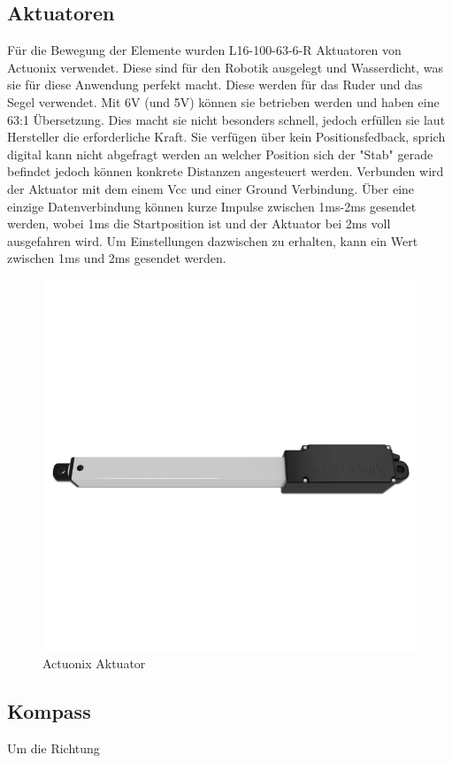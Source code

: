 \subsection{Aktuatoren}
Für die Bewegung der Elemente wurden L16-100-63-6-R Aktuatoren von Actuonix verwendet. Diese sind für den Robotik ausgelegt und Wasserdicht, was sie für diese Anwendung perfekt macht. Diese werden für das Ruder und das Segel verwendet. Mit 6V (und 5V) können sie betrieben werden und haben eine 63:1 Übersetzung. Dies macht sie nicht besonders schnell, jedoch erfüllen sie laut Hersteller die erforderliche Kraft.
Sie verfügen über kein Positionsfedback, sprich digital kann nicht abgefragt werden an welcher Position sich der "Stab" gerade befindet jedoch können konkrete Distanzen angesteuert werden. Verbunden wird der Aktuator mit dem einem Vcc und einer Ground Verbindung. Über eine einzige Datenverbindung können kurze Impulse zwischen 1ms-2ms gesendet werden, wobei 1ms die Startposition ist und der Aktuator bei 2ms voll ausgefahren wird. Um Einstellungen dazwischen zu erhalten, kann ein Wert zwischen 1ms und 2ms gesendet werden.  
\begin{figure}[H] 
    \centering
    \includegraphics[width=0.5\linewidth]{actuonix.png}
    \caption{Actuonix Aktuator}
    \label{fig:actuator}
\end{figure}

\subsection{Kompass}
Um die Richtung 

